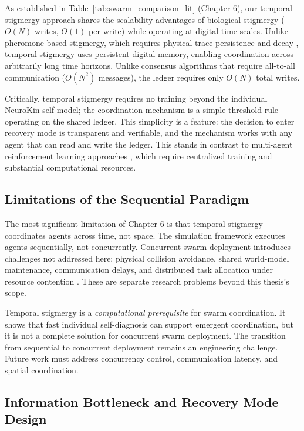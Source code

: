 \documentclass[12pt,a4paper,oneside]{report}
\begin{document}
As established in Table~\ref{tab:swarm_comparison_lit} (Chapter 6), our temporal stigmergy approach shares the scalability advantages of biological stigmergy ($O(N)$ writes, $O(1)$ per write) while operating at digital time scales. Unlike pheromone-based stigmergy, which requires physical trace persistence and decay \cite{bongard2006resilient}, temporal stigmergy uses persistent digital memory, enabling coordination across arbitrarily long time horizons. Unlike consensus algorithms that require all-to-all communication ($O(N^2)$ messages), the ledger requires only $O(N)$ total writes.

Critically, temporal stigmergy requires no training beyond the individual NeuroKin self-model; the coordination mechanism is a simple threshold rule operating on the shared ledger. This simplicity is a feature: the decision to enter recovery mode is transparent and verifiable, and the mechanism works with any agent that can read and write the ledger. This stands in contrast to multi-agent reinforcement learning approaches \cite{domberg2026selfadapting, daneshmand2026slowrl}, which require centralized training and substantial computational resources.

\subsection{Limitations of the Sequential Paradigm}

The most significant limitation of Chapter 6 is that temporal stigmergy coordinates agents across time, not space. The simulation framework executes agents sequentially, not concurrently. Concurrent swarm deployment introduces challenges not addressed here: physical collision avoidance, shared world-model maintenance, communication delays, and distributed task allocation under resource contention \cite{matsuki2024gaussian, keetha2024splattam}. These are separate research problems beyond this thesis's scope.

Temporal stigmergy is a \textit{computational prerequisite} for swarm coordination. It shows that fast individual self-diagnosis can support emergent coordination, but it is not a complete solution for concurrent swarm deployment. The transition from sequential to concurrent deployment remains an engineering challenge. Future work must address concurrency control, communication latency, and spatial coordination.

\subsection{Information Bottleneck and Recovery Mode Design}
\end{document}
